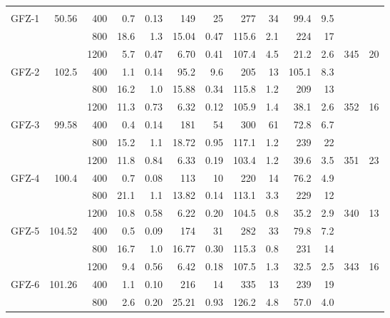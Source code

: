\documentclass[authoryear,review,12pt]{elsarticle}
\begin{document}
\begin{table}
\begin{tabular}{|r|rrrrrrrrrrrr|}
          &       &       &       &       &       &       &       &       &       &       &       &  \\
    GFZ-1 & 50.56 & 400   & 0.7   & 0.13  & 149   & 25    & 277   & 34    & 99.4  & 9.5   &       &  \\
          &       & 800   & 18.6  & 1.3   & 15.04 & 0.47  & 115.6 & 2.1   & 224   & 17    &       &  \\
          &       & 1200  & 5.7   & 0.47  & 6.70  & 0.41  & 107.4 & 4.5   & 21.2  & 2.6   & 345   & 20 \\
    GFZ-2 & 102.5 & 400   & 1.1   & 0.14  & 95.2  & 9.6   & 205   & 13    & 105.1 & 8.3   &       &  \\
          &       & 800   & 16.2  & 1.0   & 15.88 & 0.34  & 115.8 & 1.2   & 209   & 13    &       &  \\
          &       & 1200  & 11.3  & 0.73  & 6.32  & 0.12  & 105.9 & 1.4   & 38.1  & 2.6   & 352   & 16 \\
    GFZ-3 & 99.58 & 400   & 0.4   & 0.14  & 181   & 54    & 300   & 61    & 72.8  & 6.7   &       &  \\
          &       & 800   & 15.2  & 1.1   & 18.72 & 0.95  & 117.1 & 1.2   & 239   & 22    &       &  \\
          &       & 1200  & 11.8  & 0.84  & 6.33  & 0.19  & 103.4 & 1.2   & 39.6  & 3.5   & 351   & 23 \\
    GFZ-4 & 100.4 & 400   & 0.7   & 0.08  & 113   & 10    & 220   & 14    & 76.2  & 4.9   &       &  \\
          &       & 800   & 21.1  & 1.1   & 13.82 & 0.14  & 113.1 & 3.3   & 229   & 12    &       &  \\
          &       & 1200  & 10.8  & 0.58  & 6.22  & 0.20  & 104.5 & 0.8   & 35.2  & 2.9   & 340   & 13 \\
    GFZ-5 & 104.52 & 400   & 0.5   & 0.09  & 174   & 31    & 282   & 33    & 79.8  & 7.2   &       &  \\
          &       & 800   & 16.7  & 1.0   & 16.77 & 0.30  & 115.3 & 0.8   & 231   & 14    &       &  \\
          &       & 1200  & 9.4   & 0.56  & 6.42  & 0.18  & 107.5 & 1.3   & 32.5  & 2.5   & 343   & 16 \\
    GFZ-6 & 101.26 & 400   & 1.1   & 0.10  & 216   & 14    & 335   & 13    & 239   & 19    &       &  \\
          &       & 800   & 2.6   & 0.20  & 25.21 & 0.93  & 126.2 & 4.8   & 57.0  & 4.0   &       &  \\

\end{tabular}
\end{table}
\end{document}
